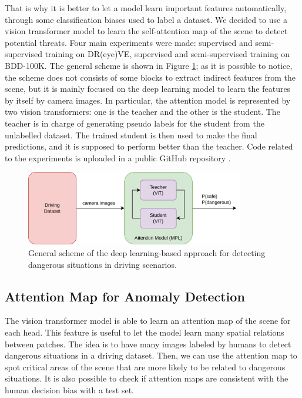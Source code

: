 That is why it is better to let a model learn important features automatically, through 
some classification biases used to label a dataset. We decided to use a vision 
transformer model to learn the self-attention map of the scene to detect 
potential threats.
Four main experiments were made: supervised and semi-supervised training on DR(eye)VE, 
supervised and semi-supervised training on BDD-100K.
The general scheme is shown in Figure \ref{fig:dl_approach_scheme}; as it is 
possible to notice, the scheme does not consists of some blocks to extract 
indirect features from the scene, but it is mainly focused on the deep learning 
model to learn the features by itself by camera images. In particular, the 
attention model is represented by two vision transformers: one is the teacher and 
the other is the student. The teacher is in charge of generating pseudo labels 
for the student from the unlabelled dataset. The trained student is then used 
to make the final predictions, and it is supposed to perform better than the
teacher.
Code related to the experiments is uploaded in a public GitHub repository 
\cite{github_repo}.
\begin{figure}
\centering
\includegraphics[width=0.85\textwidth]{images/ssl/dl_approach_scheme.png}
\vspace{0.4cm}
\caption[Deep learning-based detection model of dangerous scenarios.]
{General scheme of the deep learning-based approach for detecting
dangerous situations in driving scenarios.}
\label{fig:dl_approach_scheme}
\end{figure}

\subsection{Attention Map for Anomaly Detection}
The vision transformer model is able to learn an attention map of the scene for 
each head. This feature is useful to let the model learn many spatial relations 
between patches. The idea is to have many images labeled by humans to detect 
dangerous situations in a driving dataset. Then, we can use the attention map 
to spot critical areas of the scene that are more likely to be related to 
dangerous situations.
It is also possible to check if attention maps are consistent with the human 
decision bias with a test set.


